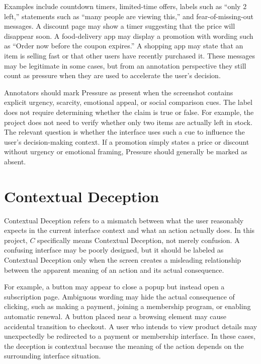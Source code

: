 Examples include countdown timers, limited-time offers, labels such as ``only 2 left,'' statements such as ``many people are viewing this,'' and fear-of-missing-out messages. A discount page may show a timer suggesting that the price will disappear soon. A food-delivery app may display a promotion with wording such as ``Order now before the coupon expires.'' A shopping app may state that an item is selling fast or that other users have recently purchased it. These messages may be legitimate in some cases, but from an annotation perspective they still count as pressure when they are used to accelerate the user's decision.

Annotators should mark Pressure as present when the screenshot contains explicit urgency, scarcity, emotional appeal, or social comparison cues. The label does not require determining whether the claim is true or false. For example, the project does not need to verify whether only two items are actually left in stock. The relevant question is whether the interface uses such a cue to influence the user's decision-making context. If a promotion simply states a price or discount without urgency or emotional framing, Pressure should generally be marked as absent.

\section{Contextual Deception}

Contextual Deception refers to a mismatch between what the user reasonably expects in the current interface context and what an action actually does. In this project, \(C\) specifically means Contextual Deception, not merely confusion. A confusing interface may be poorly designed, but it should be labeled as Contextual Deception only when the screen creates a misleading relationship between the apparent meaning of an action and its actual consequence.

For example, a button may appear to close a popup but instead open a subscription page. Ambiguous wording may hide the actual consequence of clicking, such as making a payment, joining a membership program, or enabling automatic renewal. A button placed near a browsing element may cause accidental transition to checkout. A user who intends to view product details may unexpectedly be redirected to a payment or membership interface. In these cases, the deception is contextual because the meaning of the action depends on the surrounding interface situation.

